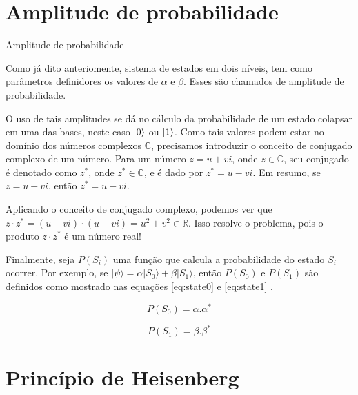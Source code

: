 	\section{Amplitude de probabilidade}
	
	\begin{frame}[allowframebreaks]{Amplitude de probabilidade}
		\par Como já dito anteriomente, sistema de estados em dois níveis, tem como parâmetros definidores os valores de  $\alpha$ e $\beta$. Esses são chamados de amplitude de probabilidade.\newline
		\par O uso de tais amplitudes se dá no cálculo da probabilidade de um estado colapsar em uma das bases, neste caso $\ket{0}$ ou $\ket{1}$. Como tais valores podem estar no domínio dos números complexos $\mathbb{C}$, precisamos introduzir o conceito de conjugado complexo de um número. Para um número $z = u + vi$, onde $z \in \mathbb{C}$, seu conjugado é denotado como $z^*$, onde $z^* \in \mathbb{C}$, e é dado por $z^* = u - vi$. Em resumo, se $z = u + vi$, então $z^* = u - vi$. \newline
		
		Aplicando o conceito de conjugado complexo, podemos ver que $z \cdot z^* = (u + vi) \cdot (u - vi) = u^2 + v^2 \in \mathbb{R}$. Isso resolve o problema, pois o produto $z \cdot z^*$ é um número real! \newline
		
		Finalmente, seja \(P(S_i)\) uma função que calcula a probabilidade do estado \(S_i\) ocorrer. Por exemplo, se \(|\psi\rangle = \alpha |S_0\rangle + \beta |S_1\rangle\), então \(P(S_0)\) e \(P(S_1)\) são definidos como mostrado nas equações \ref{eq:state0} e \ref{eq:state1} \cite{binney2013physics}.
		
		\begin{equation}
			\label{eq:state0}
			P(S_0) = \alpha . \alpha^* 
		\end{equation} 
		
		\begin{equation}
			\label{eq:state1}
			P(S_1) = \beta . \beta^* 
		\end{equation}
		
	\end{frame}

	\section{Princípio de Heisenberg}
	
